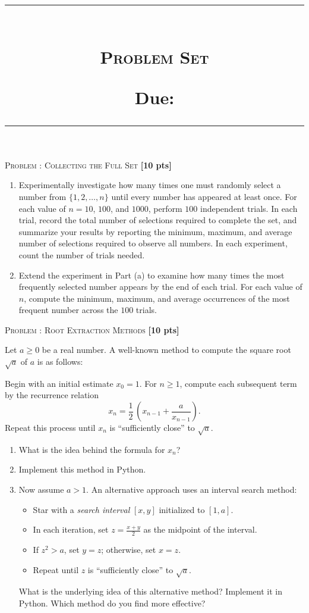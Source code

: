 \documentclass[a4paper,11pt]{article}
\title{
\hrule
\vspace{-0.5em}
\begin{multicols}{2}
\raggedright \large \textbf{\course}\\ %
\large \textsc{Problem Set \pset} \\
\vspace{0.25em}

\raggedleft \small \textbf{Due:} \due \\
\end{multicols}
\vspace{-0.3em}
\hrule}
\date{}
\author{}
\newenvironment{tcomment}[1][]{
	\begin{mdframed}[
		linecolor=black,
		linewidth=0.5pt,
		innerleftmargin=5pt,
		innerrightmargin=5pt,
		innertopmargin=5pt,
		innerbottommargin=5pt
		]
		\small\color[RGB]{70,70,70}
		\textbf{Notes:}\par\vspace{5cm}
		}{\end{mdframed}}
\newcounter{pnr}
\newenvironment{problem}[2][]{
\noindent\textsc{Problem \arabic{pnr}: #2} \hfill \textbf{[#1 pts]}\par
	\stepcounter{pnr}
	}{
	}{\vspace{0.3cm}}
\begin{document}
\maketitle
\vspace{-1cm}
\begin{problem}[10]{Collecting the Full Set}
	\begin{enumerate}
		\item Experimentally investigate how many times one must randomly select a number from $\{1, 2, \ldots, n\}$ until every number has appeared at least once. For each value of $n= 10$, $100$, and $1000$, perform $100$ independent trials. In each trial, record the total number of selections required to complete the set, and summarize your results by reporting the minimum, maximum, and average number of selections required to observe all numbers. In each experiment, count the number of trials needed.
		
		\item Extend the experiment in Part (a) to examine how many times the most frequently selected number appears by the end of each trial. For each value of $n$, compute the minimum, maximum, and average occurrences of the most frequent number across the $100$ trials.
	\end{enumerate}
\end{problem}

\begin{problem}[10]{Root Extraction Methods}
	Let $a \geq 0$ be a real number. A well-known method to compute the square root $\sqrt{a}$ of $a$ is as follows:
	
	Begin with an initial estimate $x_0 = 1$. For $n \geq 1$, compute each subsequent term by the recurrence relation 
	\[
	x_n = \frac{1}{2}\,\left(x_{n - 1} + \frac{a}{x_{n - 1}}\right).
	\]
	Repeat this process until $x_n$ is ``sufficiently close'' to $\sqrt{a}$.
	
	\begin{enumerate}
		\item What is the idea behind the formula for $x_n$?
		
		\item Implement this method in Python.
		
		\item Now assume $a > 1$. An alternative approach uses an interval search method:
		\begin{itemize}
			\item Star with a \emph{search interval} $[x,y]$ initialized to $[1, a]$.
			\item In each iteration, set $z = \frac{x + y}{2}$ as the midpoint of the interval.
			\item If $z^2 > a$, set $y = z$; otherwise, set $x = z$.
			\item Repeat until $z$ is ``sufficiently close'' to $\sqrt{a}$.
		\end{itemize}
		What is the underlying idea of this alternative method? Implement it in Python. Which method do you find more effective?
	\end{enumerate}
\end{problem}
\end{document}
